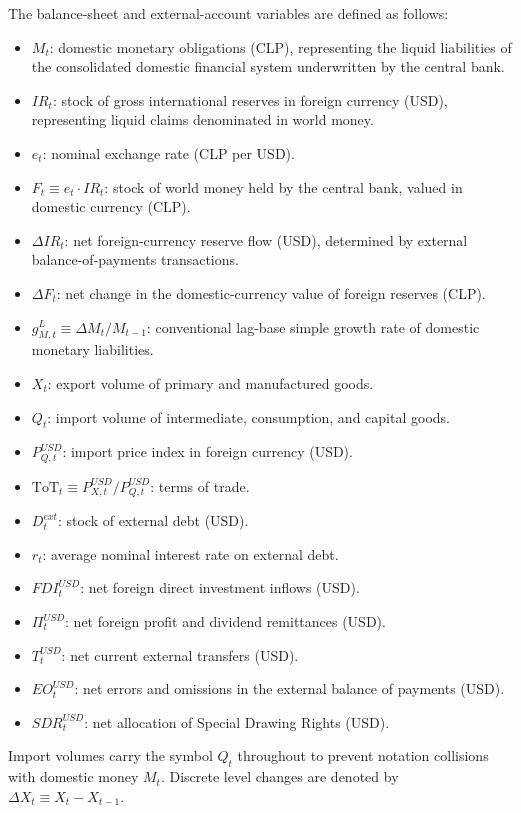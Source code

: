 The balance-sheet and external-account variables are defined as follows:
\begin{itemize}[leftmargin=2em]
	\item $M_t$: domestic monetary obligations (CLP), representing the liquid liabilities of the consolidated domestic financial system underwritten by the central bank.
	\item $IR_t$: stock of gross international reserves in foreign currency (USD), representing liquid claims denominated in world money.
	\item $e_t$: nominal exchange rate (CLP per USD).
	\item $F_t \equiv e_t \cdot IR_t$: stock of world money held by the central bank, valued in domestic currency (CLP).
	\item $\Delta IR_t$: net foreign-currency reserve flow (USD), determined by external balance-of-payments transactions.
	\item $\Delta F_t$: net change in the domestic-currency value of foreign reserves (CLP).
	\item $g^L_{M,t} \equiv \Delta M_t / M_{t-1}$: conventional lag-base simple growth rate of domestic monetary liabilities.
	\item $X_t$: export volume of primary and manufactured goods.
	\item $Q_t$: import volume of intermediate, consumption, and capital goods.
	\item $P_{Q,t}^{USD}$: import price index in foreign currency (USD).
	\item $\text{ToT}_t \equiv P_{X,t}^{USD} / P_{Q,t}^{USD}$: terms of trade.
	\item $D_t^{ext}$: stock of external debt (USD).
	\item $r_t$: average nominal interest rate on external debt.
	\item $FDI_t^{USD}$: net foreign direct investment inflows (USD).
	\item $\Pi_t^{USD}$: net foreign profit and dividend remittances (USD).
	\item $T_t^{USD}$: net current external transfers (USD).
	\item $EO_t^{USD}$: net errors and omissions in the external balance of payments (USD).
	\item $SDR_t^{USD}$: net allocation of Special Drawing Rights (USD).
\end{itemize}

Import volumes carry the symbol $Q_t$ throughout to prevent notation collisions with domestic money $M_t$. Discrete level changes are denoted by $\Delta X_t \equiv X_t - X_{t-1}$.

